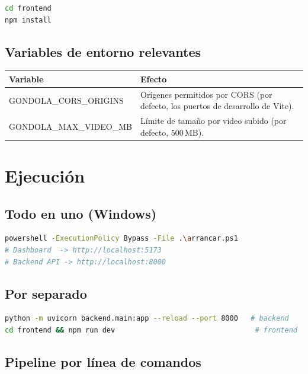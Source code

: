 \documentclass[11pt,a4paper]{report}
\begin{document}
\begin{lstlisting}[language=bash]
cd frontend
npm install
\end{lstlisting}

\section{Variables de entorno relevantes}

\begin{longtable}{>{\ttfamily\raggedright\footnotesize\arraybackslash}p{5.0cm} >{\raggedright\arraybackslash}p{9.4cm}}
\toprule
\rowcolor{rvCodeBg}\textbf{Variable} & \textbf{Efecto} \\
\midrule
\endhead
GONDOLA\_CORS\_ORIGINS & Orígenes permitidos por CORS (por defecto, los puertos de desarrollo de
Vite). \\
GONDOLA\_MAX\_VIDEO\_MB & Límite de tamaño por video subido (por defecto, 500\,MB). \\
\bottomrule
\end{longtable}

\chapter{Ejecución}

\section{Todo en uno (Windows)}

\begin{lstlisting}[language=bash]
powershell -ExecutionPolicy Bypass -File .\arrancar.ps1
# Dashboard  -> http://localhost:5173
# Backend API -> http://localhost:8000
\end{lstlisting}

\section{Por separado}

\begin{lstlisting}[language=bash]
python -m uvicorn backend.main:app --reload --port 8000   # backend
cd frontend && npm run dev                                 # frontend
\end{lstlisting}

\section{Pipeline por línea de comandos}
\end{document}
